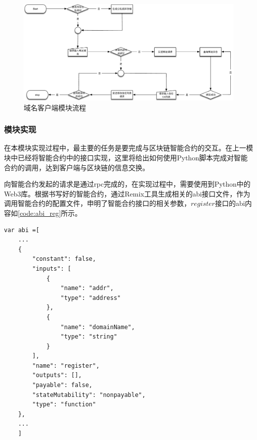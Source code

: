 \begin{figure}[!htbp]
 	\centering
 	\includegraphics[width=1\textwidth]{img/domaincli_work_flow}
 	\caption{域名客户端模块流程}\label{fig:domaincli_work_flow}
\end{figure}


\subsubsection{模块实现}

在本模块实现过程中，最主要的任务是要完成与区块链智能合约的交互。在上一模块中已经将智能合约中的接口实现，这里将给出如何使用Python脚本完成对智能合约的调用，达到客户端与区块链的信息交换。

向智能合约发起的请求是通过rpc完成的，在实现过程中，需要使用到Python中的Web3库。根据书写好的智能合约，通过Remix工具生成相关的abi接口文件，作为调用智能合约的配置文件，申明了智能合约接口的相关参数，$register$接口的abi内容如\ref{code:abi_reg}所示。
\begin{lstlisting}[caption={register接口的abi}, label={code:abi_reg}]
	var abi =[
	...
	{
		"constant": false,
		"inputs": [
			{
				"name": "addr",
				"type": "address"
			},
			{
				"name": "domainName",
				"type": "string"
			}
		],
		"name": "register",
		"outputs": [],
		"payable": false,
		"stateMutability": "nonpayable",
		"type": "function"
	},
	...
	]
\end{lstlisting}

